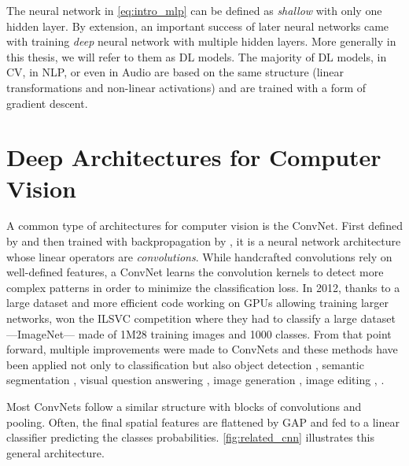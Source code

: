 The neural network in \autoref{eq:intro_mlp} can be defined as \textit{shallow} with only one hidden
layer. By extension, an important success of later neural networks came with training \textit{deep}
neural network with multiple hidden layers. More generally in this thesis, we will refer to them as
\acf{DL} models. The majority of \ac{DL} models, in \acf{CV}, in \acf{NLP}, or even in Audio are
based on the same structure (linear transformations and non-linear activations) and are trained with
a form of gradient descent.

\section{Deep Architectures for Computer Vision}
\label{sec:related_cv}

A common type of architectures for computer vision is the \acf{ConvNet}. First defined by
\citet{fukushima1980neocognitron} and then trained with backpropagation by \citet{lecun1999lenet},
it is a neural network architecture whose linear operators are \textit{convolutions}. While
handcrafted convolutions \citep{lowe1999sift} rely on well-defined features, a \ac{ConvNet} learns
the convolution kernels to detect more complex patterns in order to minimize the classification
loss. In 2012, thanks to a large dataset and more efficient code working on \acp{GPU} allowing
training larger networks, \citet{krizhevsky2012alexnet} won the ILSVC competition
\citep{russakovsky2015imagenet_ilsvrc} where they had to classify a large dataset ---ImageNet---
made of 1M28 training images and 1000 classes. From that point forward, multiple improvements were
made to \acp{ConvNet} \citep{ioffe2015batchnorm,he2016resnet} and these methods have been applied
not only to classification but also object detection \citep{ren20fasterrcnn}, semantic segmentation
\citep{chen2018deeplab}, visual question answering \citep{antol2015vqa,benyounes2017mutan}, image
generation \citep{goodfellow2014gan}, image editing \citep{grechka2021magecally,couairon2022flexit},
\etc.

Most \acp{ConvNet} follow a similar structure with blocks of convolutions and pooling. Often, the
final spatial features are flattened by \ac{GAP} and fed to a linear classifier
predicting the classes probabilities. \autoref{fig:related_cnn} illustrates this general architecture.

